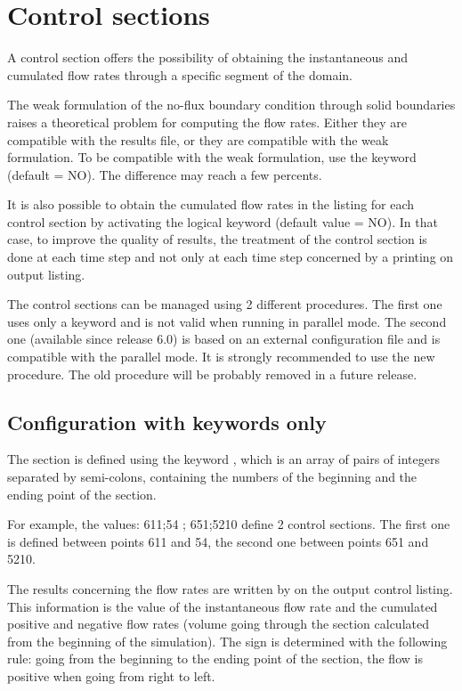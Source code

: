 \section{Control sections}
\label{sec:contr:sect}
A control section offers the possibility of obtaining the instantaneous
and cumulated flow rates through a specific segment of the domain.

The weak formulation of the no-flux boundary condition through solid boundaries
raises a theoretical problem for computing the flow rates.
Either they are compatible with the results file, or they are compatible
with the weak formulation.
To be compatible with the weak formulation, use the keyword
 (default = NO).
The difference may reach a few percents.

It is also possible to obtain the cumulated flow rates in the listing
for each control section
by activating the logical keyword 
(default value = NO).
In that case, to improve the quality of results, the treatment of the control
section is done at each time step and not only at each time step concerned
by a printing on output listing.

The control sections can be managed using 2 different procedures.
The first one uses only a keyword and is not valid when running in parallel mode.
The second one (available since release 6.0) is based on an external
configuration file and is compatible with the parallel mode.
It is strongly recommended to use the new procedure.
The old procedure will be probably removed in a future release.


\subsection{Configuration with keywords only}

The section is defined using the keyword ,
which is an array of pairs of integers separated by semi-colons,
containing the numbers of the beginning and the ending point of the section.

For example, the values: 611;54 ; 651;5210 define 2 control sections.
The first one is defined between points 611 and 54,
the second one between points 651 and 5210.

The results concerning the flow rates are written by 
on the output control listing.
This information is the value of the instantaneous flow rate
and the cumulated positive and negative flow rates
(volume going through the section calculated from the beginning of the
simulation).
The sign is determined with the following rule:
going from the beginning to the ending point of the section,
the flow is positive when going from right to left.

